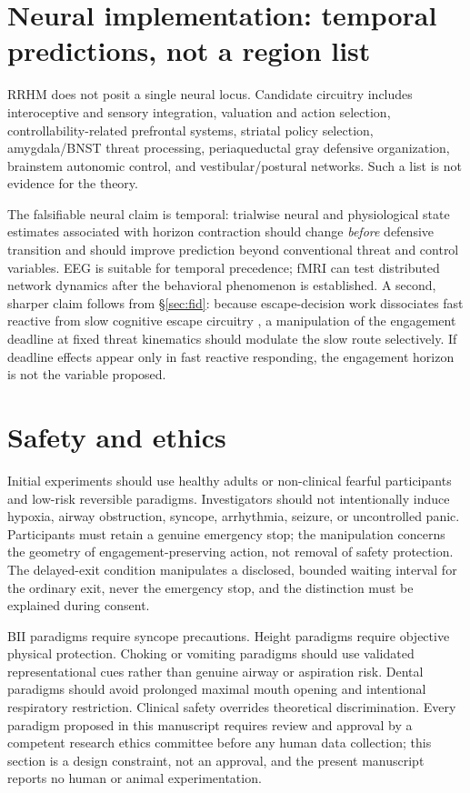 \documentclass[9pt,twocolumn]{article}
\begin{document}
\section{Neural implementation: temporal predictions, not a region list}
RRHM does not posit a single neural locus. Candidate circuitry includes interoceptive and sensory integration, valuation and action selection, controllability-related prefrontal systems, striatal policy selection, amygdala/BNST threat processing, periaqueductal gray defensive organization, brainstem autonomic control, and vestibular/postural networks. Such a list is not evidence for the theory.

The falsifiable neural claim is temporal: trialwise neural and physiological state estimates associated with horizon contraction should change \emph{before} defensive transition and should improve prediction beyond conventional threat and control variables. EEG is suitable for temporal precedence; fMRI can test distributed network dynamics after the behavioral phenomenon is established. A second, sharper claim follows from \S\ref{sec:fid}: because escape-decision work dissociates fast reactive from slow cognitive escape circuitry \cite{qi2018,fung2019}, a manipulation of the engagement deadline at fixed threat kinematics should modulate the slow route selectively. If deadline effects appear only in fast reactive responding, the engagement horizon is not the variable proposed.

\section{Safety and ethics}
\label{sec:safety}
Initial experiments should use healthy adults or non-clinical fearful participants and low-risk reversible paradigms. Investigators should not intentionally induce hypoxia, airway obstruction, syncope, arrhythmia, seizure, or uncontrolled panic. Participants must retain a genuine emergency stop; the manipulation concerns the geometry of engagement-preserving action, not removal of safety protection. The delayed-exit condition manipulates a disclosed, bounded waiting interval for the ordinary exit, never the emergency stop, and the distinction must be explained during consent.

BII paradigms require syncope precautions. Height paradigms require objective physical protection. Choking or vomiting paradigms should use validated representational cues rather than genuine airway or aspiration risk. Dental paradigms should avoid prolonged maximal mouth opening and intentional respiratory restriction. Clinical safety overrides theoretical discrimination. Every paradigm proposed in this manuscript requires review and approval by a competent research ethics committee before any human data collection; this section is a design constraint, not an approval, and the present manuscript reports no human or animal experimentation.
\end{document}
